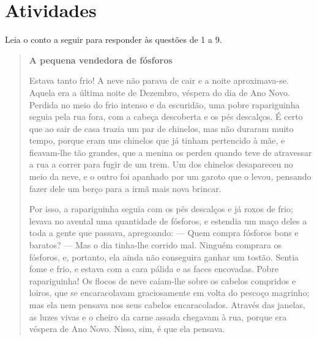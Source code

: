 \pagebreak
\section{Atividades}

Leia o conto a seguir para responder às questões de 1 a 9.


\begin{quote}
\textbf{A pequena vendedora de fósforos}


Estava tanto frio! A neve não parava de cair e a noite aproximava-se.
Aquela era a última noite de Dezembro, véspera do dia de Ano Novo.
Perdida no meio do frio intenso e da escuridão, uma pobre rapariguinha
seguia pela rua fora, com a cabeça descoberta e os pés descalços. É
certo que ao sair de casa trazia um par de chinelos, mas não duraram
muito tempo, porque eram uns chinelos que já tinham pertencido à mãe, e
ficavam-lhe tão grandes, que a menina os perdeu quando teve de
atravessar a rua a correr para fugir de um trem. Um dos chinelos
desapareceu no meio da neve, e o outro foi apanhado por um garoto que o
levou, pensando fazer dele um berço para a irmã mais nova brincar.

Por isso, a rapariguinha seguia com os pés descalços e já roxos de frio;
levava no avental uma quantidade de fósforos, e estendia um maço deles a
toda a gente que passava, apregoando: --- Quem compra fósforos bons e
baratos? --- Mas o dia tinha-lhe corrido mal. Ninguém comprara os
fósforos, e, portanto, ela ainda não conseguira ganhar um tostão. Sentia
fome e frio, e estava com a cara pálida e as faces encovadas. Pobre
rapariguinha! Os flocos de neve caíam-lhe sobre os cabelos compridos e
loiros, que se encaracolavam graciosamente em volta do pescoço magrinho;
mas ela nem pensava nos seus cabelos encaracolados. Através das janelas,
as luzes vivas e o cheiro da carne assada chegavam à rua, porque era
véspera de Ano Novo. Nisso, sim, é que ela pensava.


\end{quote}
